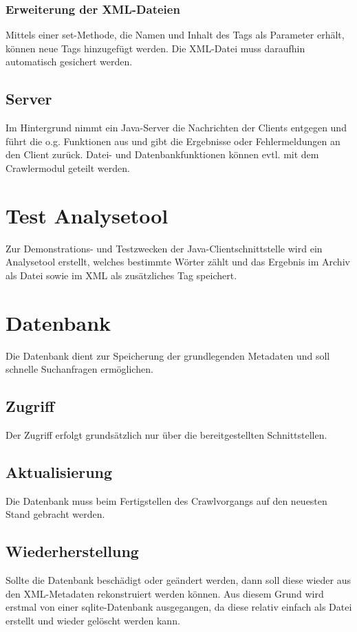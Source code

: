 	\subsubsection{Erweiterung	der XML-Dateien} \label{spec:req:jcs:meta:insert}
		Mittels einer set-Methode, die Namen und Inhalt des Tags als Parameter erhält, können neue Tags hinzugefügt werden.
		Die XML-Datei muss daraufhin automatisch gesichert werden.
\subsection{Server} \label{spec:req:jcs:server}
	Im Hintergrund nimmt ein Java-Server die Nachrichten der Clients entgegen
	und führt die o.g. Funktionen aus und gibt die Ergebnisse oder Fehlermeldungen an den Client zurück.
	Datei- und Datenbankfunktionen können evtl. mit dem Crawlermodul geteilt werden.

\section{Test Analysetool}
	Zur Demonstrations- und Testzwecken der Java-Clientschnittstelle wird ein Analysetool erstellt, welches bestimmte Wörter zählt
	und das Ergebnis im Archiv als Datei sowie im XML als zusätzliches Tag speichert.

\section{Datenbank} \label{spec:req:db}
	Die Datenbank dient zur Speicherung der grundlegenden Metadaten und soll schnelle Suchanfragen ermöglichen.
\subsection{Zugriff}
	Der Zugriff erfolgt grundsätzlich nur über die bereitgestellten Schnittstellen.
\subsection{Aktualisierung} \label{spec:req:db:update}
	Die Datenbank muss beim Fertigstellen des Crawlvorgangs auf den neuesten Stand gebracht werden.
\subsection{Wiederherstellung} \label{spec:req:db:recovery}
	Sollte die Datenbank beschädigt oder geändert werden, dann soll diese wieder aus den
	XML-Metadaten rekonstruiert werden können.
	Aus diesem Grund wird erstmal von einer sqlite-Datenbank ausgegangen, 
	da diese relativ einfach als Datei erstellt und wieder gelöscht werden kann.

